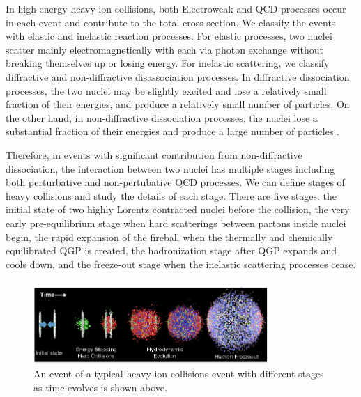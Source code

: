 In high-energy heavy-ion collisions, both Electroweak and QCD processes occur in each event and contribute to the total cross section. We classify the events with elastic and inelastic reaction processes. For elastic processes, two nuclei scatter mainly electromagnetically with each via photon exchange without breaking themselves up or losing energy. For inelastic scattering, we classify diffractive and non-diffractive disassociation processes. In diffractive dissociation processes, the two nuclei may be slightly excited and lose a relatively small fraction of their energies, and produce a relatively small number of particles. On the other hand, in non-diffractive dissociation processes, the nuclei lose a substantial fraction of their energies and produce a large number of particles \cite{CYWong}. 

Therefore, in events with significant contribution from non-diffractive dissociation, the interaction between two nuclei has multiple stages including both perturbative and non-pertubative QCD processes. We can define stages of heavy collisions and study the details of each stage. There are five stages: the initial state of two highly Lorentz contracted nuclei before the collision, the very early pre-equilibrium stage when hard scatterings between partons inside nuclei begin, the rapid expansion of the fireball when the thermally and chemically equilibrated QGP is created, the hadronization stage after QGP expands and cools down, and the freeze-out stage when the inelastic scattering processes cease.


\begin{figure}[hbtp]
\begin{center}
\includegraphics[width=0.80\textwidth]{Figures/Chapter1/Heavy-Ion-Process.png}
\caption{An event of a typical heavy-ion collisions event with different stages as time evolves is shown above.}
\label{HeavyIonStages}
\end{center}
\end{figure} 

